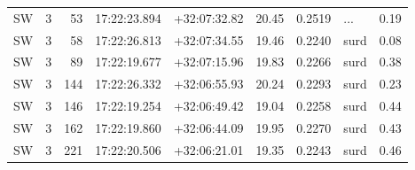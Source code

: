 \begin{tabular}{lrrllrrlr}
  SW &       3 &     53 &  17:22:23.894 &  +32:07:32.82 &  20.45 &    0.2519 &        ... &        0.19 \\
  SW &       3 &     58 &  17:22:26.813 &  +32:07:34.55 &  19.46 &    0.2240 &       surd &        0.08 \\
  SW &       3 &     89 &  17:22:19.677 &  +32:07:15.96 &  19.83 &    0.2266 &       surd &        0.38 \\
  SW &       3 &    144 &  17:22:26.332 &  +32:06:55.93 &  20.24 &    0.2293 &       surd &        0.23 \\
  SW &       3 &    146 &  17:22:19.254 &  +32:06:49.42 &  19.04 &    0.2258 &       surd &        0.44 \\
  SW &       3 &    162 &  17:22:19.860 &  +32:06:44.09 &  19.95 &    0.2270 &       surd &        0.43 \\
  SW &       3 &    221 &  17:22:20.506 &  +32:06:21.01 &  19.35 &    0.2243 &       surd &        0.46 \\
\bottomrule
\end{tabular}
